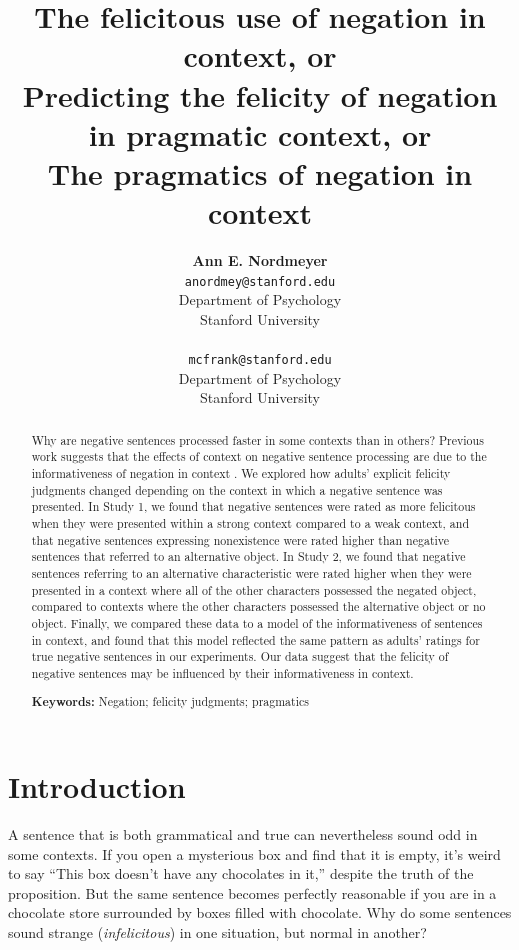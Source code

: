 \documentclass[10pt,letterpaper]{article}
\title{The felicitous use of negation in context, or \\
Predicting the felicity of negation in pragmatic context, or \\
The pragmatics of negation in context}
\author{{\large \bf Ann E. Nordmeyer} \\ \texttt{anordmey@stanford.edu}\\ Department of Psychology \\ Stanford University \\ 
\And {\large \bf Michael C. Frank} \\ \texttt{mcfrank@stanford.edu} \\ Department of Psychology \\ Stanford University \\ }
\begin{document}
\maketitle


\begin{abstract}
Why are negative sentences processed faster in some contexts than in others?  Previous work suggests that the effects of context on negative sentence processing are due to the informativeness of negation in context \cite{nordmeyer2014}.  We explored how adults' explicit felicity judgments changed depending on the context in which a negative sentence was presented.  In Study 1, we found that negative sentences were rated as more felicitous when they were presented within a strong context compared to a weak context, and that negative sentences expressing nonexistence were rated higher than negative sentences that referred to an alternative object.  In Study 2, we found that negative sentences referring to an alternative characteristic were rated higher when they were presented in a context where all of the other characters possessed the negated object, compared to contexts where the other characters possessed the alternative object or no object.  Finally, we compared these data to a model of the informativeness of sentences in context, and found that this model reflected the same pattern as adults' ratings for true negative sentences in our experiments.  Our data suggest that the felicity of negative sentences may be influenced by their informativeness in context.  


\textbf{Keywords:} 
Negation; felicity judgments; pragmatics
\end{abstract}

\section{Introduction}


A sentence that is both grammatical and true can nevertheless sound odd in some contexts. If you open a mysterious box and find that it is empty, it's weird to say ``This box doesn't have any chocolates in it,'' despite the truth of the proposition. But the same sentence becomes perfectly reasonable if you are in a chocolate store surrounded by boxes filled with chocolate.  Why do some sentences sound strange (\emph{infelicitous}) in one situation, but normal in another?
\end{document}
